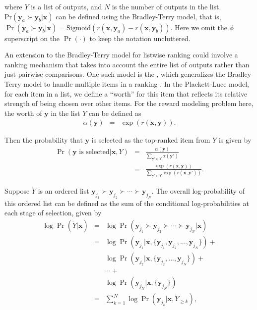 \noindent where $Y$ is a list of outputs, and $N$ is the number of outputs in the list. $\mathrm{Pr}(\mathbf{y}_a \succ \mathbf{y}_b | \mathbf{x})$ can be defined using the Bradley-Terry model, that is, $\Pr(\mathbf{y}_a \succ \mathbf{y}_b | \mathbf{x}) = \mathrm{Sigmoid}(r(\mathbf{x},\mathbf{y}_a)-r(\mathbf{x},\mathbf{y}_b))$. Here we omit the $\phi$ superscript on the $\Pr(\cdot)$ to keep the notation uncluttered.

An extension to the Bradley-Terry model for listwise ranking could involve a ranking mechanism that takes into account the entire list of outputs rather than just pairwise comparisons. One such model is the , which generalizes the Bradley-Terry model to handle multiple items in a ranking \cite{plackett:1975analysis}. In the Plackett-Luce model, for each item in a list, we define a ``worth'' for this item that reflects its relative strength of being chosen over other items. For the reward modeling problem here, the worth of $\mathbf{y}$ in the list $Y$ can be defined as
\begin{eqnarray}
\alpha(\mathbf{y}) & = & \exp(r(\mathbf{x},\mathbf{y})).
\end{eqnarray}

\noindent Then the probability that $\mathbf{y}$ is selected as the top-ranked item from $Y$ is given by
\begin{eqnarray}
\Pr(\mathbf{y}\text{ is selected}|\mathbf{x},Y) & = & \frac{\alpha(\mathbf{y})}{\sum_{\mathbf{y}' \in Y} \alpha(\mathbf{y}')} \nonumber \\
                                                & = & \frac{\exp(r(\mathbf{x},\mathbf{y}))}{\sum_{\mathbf{y}' \in Y} \exp(r(\mathbf{x},\mathbf{y}'))}.
\end{eqnarray}

Suppose $\mathring{Y}$ is an ordered list $\mathbf{y}_{j_1} \succ \mathbf{y}_{j_2} \succ \cdots \succ \mathbf{y}_{j_N}$. The overall log-probability of this ordered list can be defined as the sum of the conditional log-probabilities at each stage of selection, given by
\begin{eqnarray}
\log \Pr(\mathring{Y} | \mathbf{x}) & = & \log \Pr(\mathbf{y}_{j_1} \succ \mathbf{y}_{j_2} \succ \cdots \succ \mathbf{y}_{j_N} | \mathbf{x}) \nonumber \\
                                    & = & \log \Pr(\mathbf{y}_{j_1} | \mathbf{x}, \{\mathbf{y}_{j_1},\mathbf{y}_{j_2},...,\mathbf{y}_{j_N}\}) + \nonumber \\
                                    &   & \log \Pr(\mathbf{y}_{j_2} | \mathbf{x}, \{\mathbf{y}_{j_2},...,\mathbf{y}_{j_N}\}) + \nonumber \\
                                    &   & \cdots + \nonumber \\
                                    &   & \log \Pr(\mathbf{y}_{j_N} | \mathbf{x}, \{\mathbf{y}_{j_N}\}) \nonumber \\
                                    & = & \sum_{k = 1}^{N} \log \Pr(\mathbf{y}_{j_k} | \mathbf{x}, \mathring{Y}_{\ge k}),
\end{eqnarray}

